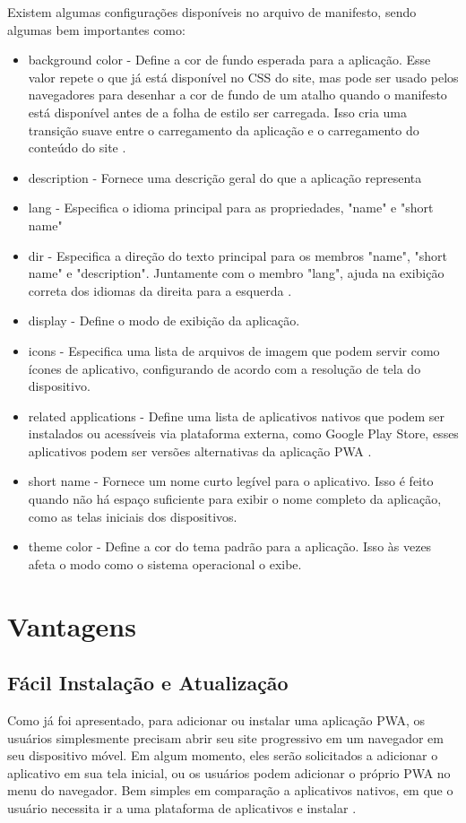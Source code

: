 Existem algumas configurações disponíveis no arquivo de manifesto, sendo algumas bem importantes como:

\begin{itemize}
	\item background color - Define a cor de fundo esperada para a aplicação. Esse valor repete o que já está disponível no CSS do site, mas pode ser usado pelos navegadores para desenhar a cor de fundo de um atalho quando o manifesto está disponível antes de a folha de estilo ser carregada. Isso cria uma transição suave entre o carregamento da aplicação e o carregamento do conteúdo do site \cite{manifestfile}.
	\item description - Fornece uma descrição geral do que a aplicação representa
	\item lang - Especifica o idioma principal para as propriedades, "name" e "short name"
	\item dir - Especifica a direção do texto principal para os membros "name", "short name" e "description". Juntamente com o membro "lang", ajuda na exibição correta dos idiomas da direita para a esquerda \cite{manifestfile}.
	\item display - Define o modo de exibição da aplicação.
	\item icons - Especifica uma lista de arquivos de imagem que podem servir como ícones de aplicativo, configurando de acordo com a resolução de tela do dispositivo.
	\item related applications - Define uma lista de aplicativos nativos que podem ser instalados ou acessíveis via plataforma externa, como Google Play Store, esses aplicativos podem ser versões alternativas da aplicação \ac{PWA} \cite{manifestfile}.
	\item short name - Fornece um nome curto legível para o aplicativo. Isso é feito quando não há espaço suficiente para exibir o nome completo da aplicação, como as telas iniciais dos dispositivos.
	\item theme color - Define a cor do tema padrão para a aplicação. Isso às vezes afeta o modo como o sistema operacional o exibe.
\end{itemize}

\section{Vantagens}
\subsection{Fácil Instalação e Atualização}
Como já foi apresentado, para adicionar ou instalar uma aplicação \ac{PWA}, os usuários simplesmente precisam abrir seu site progressivo em um navegador em seu dispositivo móvel. Em algum momento, eles serão solicitados a adicionar o aplicativo em sua tela inicial, ou os usuários podem adicionar o próprio \ac{PWA} no menu do navegador. Bem simples em comparação a aplicativos nativos, em que o usuário necessita ir a uma plataforma de aplicativos e instalar \cite{pwabenefits}.

